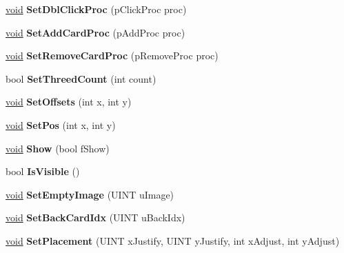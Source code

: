 \begin{DoxyCompactItemize}
\hyperlink{interfacevoid}{void} {\bfseries Set\+Dbl\+Click\+Proc} (p\+Click\+Proc proc)
\item 
\mbox{\label{class_card_region_a5b76706e5aeaba1255565c12bb022442}} 
\hyperlink{interfacevoid}{void} {\bfseries Set\+Add\+Card\+Proc} (p\+Add\+Proc proc)
\item 
\mbox{\label{class_card_region_a4992050a7fe94315a5b2dd2fafc86b6a}} 
\hyperlink{interfacevoid}{void} {\bfseries Set\+Remove\+Card\+Proc} (p\+Remove\+Proc proc)
\item 
\mbox{\label{class_card_region_a75d7314ae0062725349c1bc0bb6bafa9}} 
bool {\bfseries Set\+Threed\+Count} (int count)
\item 
\mbox{\label{class_card_region_a9954de47861c03d8b0a472385a4650f6}} 
\hyperlink{interfacevoid}{void} {\bfseries Set\+Offsets} (int x, int y)
\item 
\mbox{\label{class_card_region_a984b87144ec18b003aec7f65ce42cd4f}} 
\hyperlink{interfacevoid}{void} {\bfseries Set\+Pos} (int x, int y)
\item 
\mbox{\label{class_card_region_a2aa7f0bb5f093f864a19df299f8d67c1}} 
\hyperlink{interfacevoid}{void} {\bfseries Show} (bool f\+Show)
\item 
\mbox{\label{class_card_region_a10a7088c89b5139eaacd4fae14fd90d3}} 
bool {\bfseries Is\+Visible} ()
\item 
\mbox{\label{class_card_region_a2f44617e0614da8d80fdf705d44de011}} 
\hyperlink{interfacevoid}{void} {\bfseries Set\+Empty\+Image} (U\+I\+NT u\+Image)
\item 
\mbox{\label{class_card_region_a17d09e6781b31062b4b0ca0032b16243}} 
\hyperlink{interfacevoid}{void} {\bfseries Set\+Back\+Card\+Idx} (U\+I\+NT u\+Back\+Idx)
\item 
\mbox{\label{class_card_region_a56ea070e0d35a364e5d9787c69a01b7a}} 
\hyperlink{interfacevoid}{void} {\bfseries Set\+Placement} (U\+I\+NT x\+Justify, U\+I\+NT y\+Justify, int x\+Adjust, int y\+Adjust)

\end{DoxyCompactItemize}
